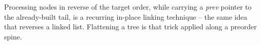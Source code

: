 \begin{takeawaybox}
Processing nodes in reverse of the target order, while carrying a
\textit{prev} pointer to the already-built tail, is a recurring in-place
linking technique -- the same idea that reverses a linked list. Flattening
a tree is that trick applied along a preorder spine.
\end{takeawaybox}
